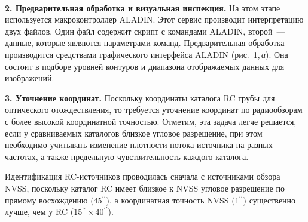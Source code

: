 \begin{multicols}{2}
\begin{figure*}[b] %
\vspace*{6pt}
 \begin{center}
 \mbox{%
 \epsfxsize=165.339mm
 }
 \end{center}
 \vspace*{-9pt}
\end{figure*}




\textbf{2. Предварительная обработка и визуальная инспекция.} На этом этапе используется 
макроконтроллер ALADIN. Этот сервис производит интерпретацию двух файлов. Один 
файл содержит скрипт с командами ALADIN, второй~--- данные, которые являются 
параметрами команд. Предварительная обработка производится средствами графического 
интерфейса ALADIN (рис.~1,\,\textit{а}). Она состоит в подборе уровней контуров и диапазона 
отображаемых данных для изображений.

\textbf{3. Уточнение координат.} Поскольку координаты каталога RC грубы для 
оптического отождествления, то требуется уточнение координат по радиообзорам с более 
высокой координатной точностью. Отметим, эта задача легче решается, если у сравниваемых 
каталогов близкое угловое разрешение, при этом необходимо учитывать изменение 
плотности потока источника на разных частотах, а также предельную чувствительность 
каждого каталога.
      
      Идентификация RC-источников проводилась сначала с источниками обзора 
NVSS, поскольку каталог RC имеет близкое к NVSS угловое разрешение по прямому 
восхождению (45$^{\prime\prime}$), а координатная точность NVSS (1$^{\prime\prime}$) 
существенно лучше, чем у RC (15$^{\prime\prime}\times40^{\prime\prime}$).
      

\end{multicols}
